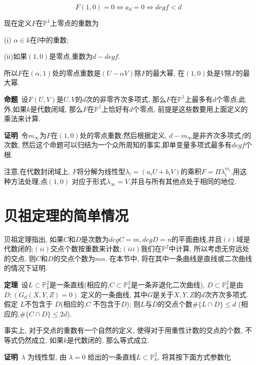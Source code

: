 \documentclass[UTF8]{book}
\begin{document}
		\begin{equation*}
			F(1,0)=0\Leftrightarrow a_{d}=0\Leftrightarrow deg f<d
		\end{equation*}
		
		现在定义$ F $在$\mathbb{P}^{1}$上零点的重数为
		
		
		(i) $\alpha \in k$在f中的重数;
		
		
		(ii)如果$ (1,0) $是零点,重数为$ d-deg f $.
		
		
		所以$ F $在$ (\alpha,1) $处的零点重数是$ (U-\alpha V) $除$ F $的最大幂, 在$ (1,0) $处是$ V $除$ F $的最大幂.
		
	
		\textbf{命题}\ 设$ F(U,V) $是$ U,V $的$ d $次的非零齐次多项式, 那么$ F $在$\mathbb{P}^{1}$上最多有$ d $个零点;此外,如果$ k $是代数闭域, 那么$ F $在$\mathbb{P}^{1}$上恰好有$ d $个零点, 前提是这些数要用上面定义的乘法来计算.
		
		
		\textbf{证明}\ 令$m_{\infty}$为$ F $在$ (1,0) $处的零点重数;然后根据定义, $d-m_{\infty}$是非齐次多项式$ f $的次数, 然后这个命题可以归结为一个众所周知的事实,即单变量多项式最多有$ deg f $个根.
		
		
		注意,在代数封闭域上, $ F $将分解为线性型$\lambda_{i}=(a_{i}U+b_{i}V)$的乘积$F=\Pi\lambda_{i}^{m_{i}}$,用这种方法处理,点$ (1,0) $ 对应于形式$\lambda_{\infty}=V$,并且与所有其他点处于相同的地位.
	\section{贝祖定理的简单情况}
		贝祖定理指出, 如果$ C $和$ D $是次数为$ deg C=m, deg D=n $的平面曲线,并且$ (i) $域是代数闭的;$ (ii) $交点个数按重数来计数;$ (iii)  $我们在$\mathbb{P}^{2}$中计算, 所以考虑无穷远处的交点. 则$ C $和$ D $的交点个数为$ mn $. 在本节中, 将在其中一条曲线是直线或二次曲线的情况下证明.
		
		
		\textbf{定理}\ 设$L\subset \mathbb{P}^{2}_{k}$是一条直线(相应的,$C\subset \mathbb{P}^{2}_{k}$是一条非退化二次曲线), $D\subset \mathbb{P}^{2}_{k}$是由$D:(G_{d}(X,Y,Z)=0)$ 定义的一条曲线, 其中$ G $是关于$ X, Y, Z $的$ d $次齐次多项式. 假定 $ L $不包含于 $ D $(相应的,$ C $ 不包含于$ D $); 则$ L $与$ D $的交点个数$\# \{L\cap D\}\leq d $ (相应的,$\# \{C\cap D\}\leq 2d $).
		
		
		事实上, 对于交点的重数有一个自然的定义, 使得对于用重性计数的交点的个数, 不等式仍然成立, 如果$ k $是代数闭的, 那么等式成立.
		
		
		\textbf{证明}\ $\lambda$ 为线性型, 由 $\lambda=0$ 给出的一条直线$L\subset \mathbb{P}^{2}_{k}$, 将其按下面方式参数化
		
\end{document}
